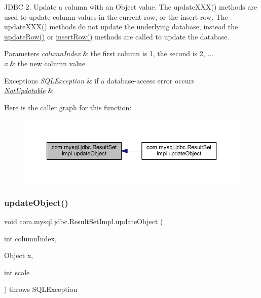 J\+D\+BC 2. Update a column with an Object value. The update\+X\+X\+X() methods are used to update column values in the current row, or the insert row. The update\+X\+X\+X() methods do not update the underlying database, instead the \mbox{\hyperlink{classcom_1_1mysql_1_1jdbc_1_1_result_set_impl_a2842d32292d023aaeeafedeed3322981}{update\+Row()}} or \mbox{\hyperlink{classcom_1_1mysql_1_1jdbc_1_1_result_set_impl_a78e304e3279cbcf60392f18c1385e3bf}{insert\+Row()}} methods are called to update the database.


\begin{DoxyParams}{Parameters}
{\em column\+Index} & the first column is 1, the second is 2, ... \\
\hline
{\em x} & the new column value\\
\hline
\end{DoxyParams}

\begin{DoxyExceptions}{Exceptions}
{\em S\+Q\+L\+Exception} & if a database-\/access error occurs \\
\hline
{\em \mbox{\hyperlink{classcom_1_1mysql_1_1jdbc_1_1_not_updatable}{Not\+Updatable}}} & \\
\hline
\end{DoxyExceptions}
Here is the caller graph for this function\+:
\nopagebreak
\begin{figure}[H]
\begin{center}
\leavevmode
\includegraphics[width=350pt]{classcom_1_1mysql_1_1jdbc_1_1_result_set_impl_a7e7ce7db4f6ce71a461c613244cab080_icgraph}
\end{center}
\end{figure}
\mbox{\label{classcom_1_1mysql_1_1jdbc_1_1_result_set_impl_a2ff2f59d838994e6dca11645993a7b8a}} 
\subsubsection{\texorpdfstring{update\+Object()}{updateObject()}\hspace{0.1cm}{\footnotesize\ttfamily [2/4]}}
{\footnotesize\ttfamily void com.\+mysql.\+jdbc.\+Result\+Set\+Impl.\+update\+Object (\begin{DoxyParamCaption}\item[{int}]{column\+Index,  }\item[{Object}]{x,  }\item[{int}]{scale }\end{DoxyParamCaption}) throws S\+Q\+L\+Exception}


